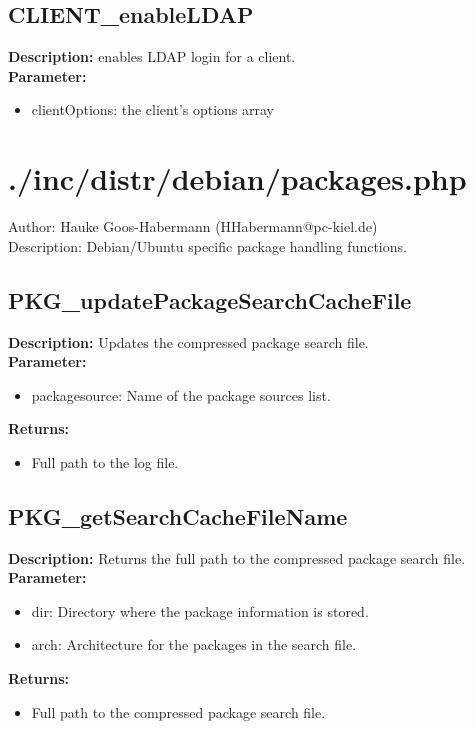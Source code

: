 \subsection{CLIENT\_enableLDAP}
\textbf{Description:} enables LDAP login for a client.\\
\textbf{Parameter:}
\begin{itemize}
\item clientOptions: the client's options array
\end{itemize}

\newpage\section{./inc/distr/debian/packages.php}
 Author: Hauke Goos-Habermann (HHabermann@pc-kiel.de)\\
 Description: Debian/Ubuntu specific package handling functions.\\

\subsection{PKG\_updatePackageSearchCacheFile}
\textbf{Description:} Updates the compressed package search file.\\
\textbf{Parameter:}
\begin{itemize}
\item packagesource: Name of the package sources list.
\end{itemize}
\textbf{Returns:}
\begin{itemize}
\item Full path to the log file.
\end{itemize}

\subsection{PKG\_getSearchCacheFileName}
\textbf{Description:} Returns the full path to the compressed package search file.\\
\textbf{Parameter:}
\begin{itemize}
\item dir: Directory where the package information is stored.
\item arch: Architecture for the packages in the search file.
\end{itemize}
\textbf{Returns:}
\begin{itemize}
\item Full path to the compressed package search file.
\end{itemize}


